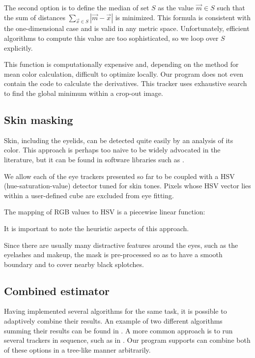 The second option is to define the median of set $S$ as the value $\vec m \in S$ such that the sum of distances $\sum_{\vec x \in S} |\vec m - \vec x|$ is minimized.
This formula is consistent with the one-dimensional case and is valid in any metric space.
Unfortunately, efficient algorithms to compute this value are too sophisticated, so we loop over $S$ explicitly.

This function is computationally expensive and, depending on the method for mean color calculation, difficult to optimize locally.
Our program does not even contain the code to calculate the derivatives.
This tracker uses exhaustive search to find the global minimum within a crop-out image.

\subsection{Skin masking}

Skin, including the eyelids, can be detected quite easily by an analysis of its color.
This approach is perhaps too naive to be widely advocated in the literature, but it can be found in software libraries such as \cite{deepgaze}.

We allow each of the eye trackers presented so far to be coupled with a HSV (hue-saturation-value) detector tuned for skin tones.
Pixels whose HSV vector lies within a user-defined cube are excluded from eye fitting.

The mapping of RGB values to HSV is a piecewise linear function:

It is important to note the heuristic aspects of this approach.

Since there are usually many distractive features around the eyes, such as the eyelashes and makeup, the mask is pre-processed so as to have a smooth boundary and to cover nearby black splotches.


\subsection{Combined estimator}

Having implemented several algorithms for the same task, it is possible to adaptively combine their results.
An example of two different algorithms summing their results can be found in \cite{leo14}.
A more common approach is to run several trackers in sequence, such as in \cite{wang16,george16,zhu12}.
Our program supports can combine both of these options in a tree-like manner arbitrarily.

